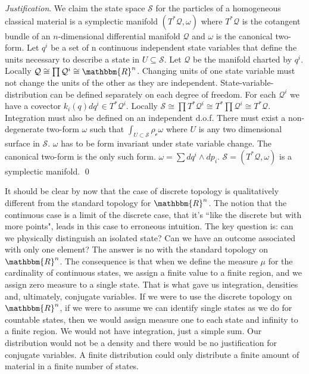 \documentclass[aps,pra,10pt,twocolumn,floatfix,nofootinbib]{revtex4-1}
\numberwithin{equation}{section}
\theoremstyle{definition}
\newenvironment{justification}{\emph{Justification}.}{\qed}
\begin{document}
\begin{justification}
	We claim the state space $\mathcal{S}$ for the particles of a homogeneous classical material is a symplectic manifold $(T^*\mathcal{Q}, \omega)$ where $T^*\mathcal{Q}$ is the cotangent bundle of an $n$-dimensional differential manifold $\mathcal{Q}$ and $\omega$ is the canonical two-form. Let $q^i$ be a set of n continuous independent state variables that define the units necessary to describe a state in $U \subseteq \mathcal{S}$. Let $\mathcal{Q}$ be the manifold charted by $q^i$. Locally $\mathcal{Q} \cong \prod \mathcal{Q}^i \cong \mathbbm{R}^n$. Changing units of one state variable must not change the units of the other as they are independent. State-variable-distribution can  be defined separately on each degree of freedom. For each $\mathcal{Q}^i$ we have a covector $k_i(q) dq^i \in T^*\mathcal{Q}^i$. Locally $\mathcal{S} \cong \prod T^*\mathcal{Q}^i \cong T^* \prod \mathcal{Q}^i \cong T^* \mathcal{Q}$. Integration must also be defined on an independent d.o.f. There must exist a non-degenerate two-form $\omega$ such that $\int_{U \subset \mathcal{S}} \rho_\mathcal{c} \omega$ where $U$ is any two dimensional surface in $\mathcal{S}$. $\omega$ has to be form invariant under state variable change. The canonical two-form is the only such form. $\omega = \sum dq^i \wedge dp_i$. $\mathcal{S} = (T^*\mathcal{Q}, \omega)$ is a symplectic manifold.
\end{justification}

It should be clear by now that the case of discrete topology is qualitatively different from the standard topology for $\mathbbm{R}^n$. The notion that the continuous case is a limit of the discrete case, that it's ``like the discrete but with more points", leads in this case to erroneous intuition. The key question is: can we physically distinguish an isolated state? Can we have an outcome associated with only one element? The answer is no with the standard topology on $\mathbbm{R}^n$. The consequence is that when we define the measure $\mu$ for the cardinality of continuous states, we assign a finite value to a finite region, and we assign zero measure to a single state. That is what gave us integration, densities and, ultimately, conjugate variables. If we were to use the discrete topology on $\mathbbm{R}^n$, if we were to assume we can identify single states as we do for countable states, then we would assign measure one to each state and infinity to a finite region. We would not have integration, just a simple sum. Our distribution would not be a density and there would be no justification for conjugate variables. A finite distribution could only distribute a finite amount of material in a finite number of states.
\end{document}
